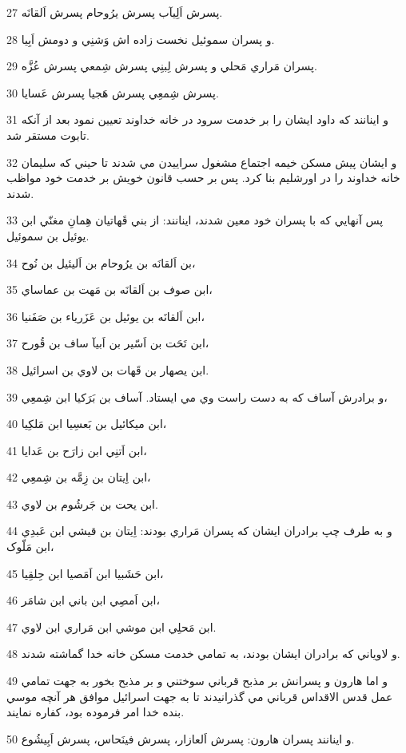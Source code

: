 \par 27 پسرش اَلِيآب پسرش يرُوحام پسرش اَلقانَه.
\par 28 و پسران سموئيل نخست زاده اش وَشنِي و دومش اَبِيا.
\par 29 پسران مَراري مَحلي و پسرش لِبنِي پسرش شِمعي پسرش عُزَّه.
\par 30 پسرش شِمعِي پسرش هَجيا پسرش عَسايا.
\par 31 و اينانند که داود ايشان را بر خدمت سرود در خانه خداوند تعيين نمود بعد از آنکه تابوت مستقر شد.
\par 32 و ايشان پيش مسکن خيمه اجتماع مشغول سراييدن مي شدند تا حيني که سليمان خانه خداوند را در اورشليم بنا کرد. پس بر حسب قانون خويش بر خدمت خود مواظب شدند.
\par 33 پس آنهايي که با پسران خود معين شدند، اينانند: از بني قَهاتيان هِمانِ مغنّي ابن يوئيل بن سموئيل.
\par 34 بن اَلقانَه بن يرُوحام بن اَليئيل بن نُوح،
\par 35 ابن صوف بن اَلقانَه بن مَهت بن عماساي،
\par 36 ابن اَلقانَه بن يوئيل بن عَزَرياء بن صَفَنيا،
\par 37 ابن تَحَت بن اَسّير بن اَبيآ ساف بن قُورح،
\par 38 ابن يصهار بن قَهات بن لاوي بن اسرائيل.
\par 39 و برادرش آساف که به دست راست وي مي ايستاد. آساف بن بَرَکيا ابن شِمعِي، 
\par 40 ابن ميکائيل بن بَعسِيا ابن مَلکِيا،
\par 41 ابن اَتنِي ابن زارَح بن عَدايا،
\par 42 ابن اِيتان بن زِمَّه بن شِمعِي،
\par 43 ابن يحت بن جَرشُوم بن لاوي.
\par 44 و به طرف چپ برادران ايشان که پسران مَراري بودند: اِيتان بن قيشي ابن عَبدِي ابن مَلّوک،
\par 45 ابن حَشَبيا ابن اَمَصيا ابن حِلقِيا،
\par 46 ابن اَمصِي ابن باني ابن شامَر،
\par 47 ابن مَحلِي ابن موشي ابن مَراري ابن لاوي.
\par 48 و لاوياني که برادران ايشان بودند، به تمامي خدمت مسکن خانه خدا گماشته شدند.
\par 49 و اما هارون و پسرانش بر مذبح قرباني سوختني و بر مذبح بخور به جهت تمامي عمل قدس الاقداس قرباني مي گذرانيدند تا به جهت اسرائيل موافق هر آنچه موسي بنده خدا امر فرموده بود، کفاره نمايند.
\par 50 و اينانند پسران هارون: پسرش اَلعازار، پسرش فينَحاس، پسرش اَبِيشُوع.

